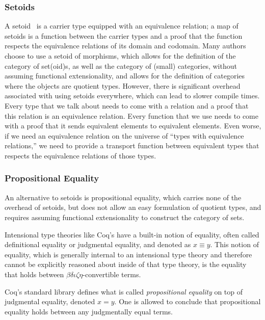 \documentclass[runningheads]{llncs}
\begin{document}
    \subsubsection{Setoids}
      A setoid~\cite{bishop1967foundations} is a carrier type equipped with an equivalence relation; a map of setoids is a function between the carrier types and a proof that the function respects the equivalence relations of its domain and codomain.  Many authors \cite{copumpkin/categories,MathClasses,megacz-coq-categories,huet2000constructive%
      }
      choose to use a setoid of morphisms, which allows for the definition of the category of set(oid)s, as well as the category of (small) categories, without assuming functional extensionality, and allows for the definition of categories where the objects are quotient types.  However, there is significant overhead associated with using setoids everywhere, which can lead to slower compile times.  Every type that we talk about needs to come with a relation and a proof that this relation is an equivalence relation.  Every function that we use needs to come with a proof that it sends equivalent elements to equivalent elements.  Even worse, if we need an equivalence relation on the universe of ``types with equivalence relations,'' we need to provide a transport function between equivalent types that respects the equivalence relations of those types.

    \subsubsection{Propositional Equality}
      An alternative to setoids is propositional equality, which carries none of the overhead of setoids, but does not allow an easy formulation of quotient types, and requires assuming functional extensionality to construct the category of sets.

      Intensional type theories like Coq's have a built-in notion of equality, often called definitional equality or judgmental equality, and denoted as $x \equiv y$.  This notion of equality, which is generally internal to an intensional type theory and therefore cannot be explicitly reasoned about inside of that type theory, is the equality that holds between $\beta\delta\iota\zeta\eta$-convertible terms.

      Coq's standard library defines what is called \emph{propositional equality} on top of judgmental equality, denoted $x = y$. One is allowed to conclude that propositional equality holds between any judgmentally equal terms.
\end{document}
